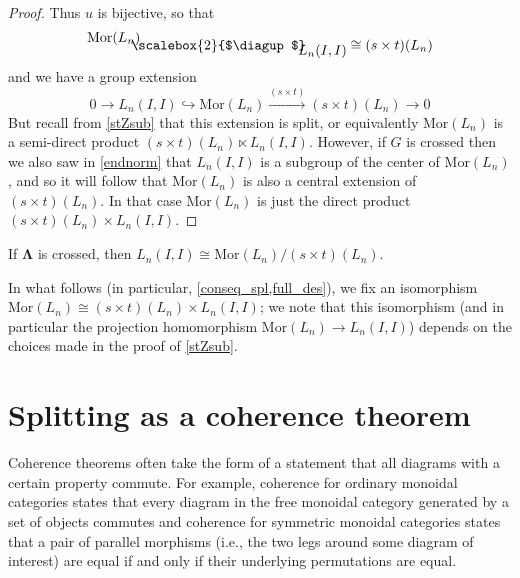 \documentclass{amsbook} %
\newcommand{\ML}{\mathbf{\Lambda}}
\newcommand{\MorLn}{\mathrm{Mor}(L_n)}
\newcommand{\bigquotient}[2]{ \raisebox{0.75\height}{$#1$} \mkern-12mu\scalebox{2}{$\diagup$}\mkern-10mu \raisebox{-0.5\height}{$#2$} }
\numberwithin{section}{chapter}
\begin{document}
\begin{proof}
Thus $u$ is bijective, so that
  \[
    \bigquotient{\MorLn}{L_n(I,I)} \cong (s \times t)(L_n)
  \]
and we have a group extension
  \[
    0 \rightarrow L_n(I,I) \hookrightarrow \MorLn \xrightarrow{(s \times t)} (s \times t)(L_n) \rightarrow 0
  \]
But recall from \cref{stZsub} that this extension is split, or equivalently $\MorLn$ is a semi-direct product $(s \times t)(L_n) \ltimes L_n(I,I)$. However, if $G$ is crossed then we also saw in \cref{endnorm} that $L_n(I,I)$ is a subgroup of the center of $\MorLn$, and so it will follow that $\MorLn$ is also a central extension of $(s \times t)(L_n)$. In that case $\MorLn$ is just the direct product $(s \times t)(L_n) \times L_n(I,I)$.
\end{proof}

\begin{cor}\label{lnII_mormodst}
If $\ML$ is crossed, then $L_n(I,I) \cong \MorLn / (s \times t)(L_n)$.
\end{cor}

\begin{conv}
In what follows (in particular, \cref{conseq_spl,full_des}), we fix an isomorphism $\MorLn \cong (s \times t)(L_n) \times L_n(I,I)$; we note that this isomorphism (and in particular the projection homomorphism $\MorLn \rightarrow L_n(I,I)$) depends on the choices made in the proof of \cref{stZsub}.

\end{conv}

\section{Splitting as a coherence theorem}\label{splitting_as_coh}

Coherence theorems often take the form of a statement that all diagrams with a certain property commute. For example, coherence for ordinary monoidal categories states that every diagram in the free monoidal category generated by a set of objects commutes and coherence for symmetric monoidal categories states that a pair of parallel morphisms (i.e., the two legs around some diagram of interest) are equal if and only if their underlying permutations are equal.
\end{document}
